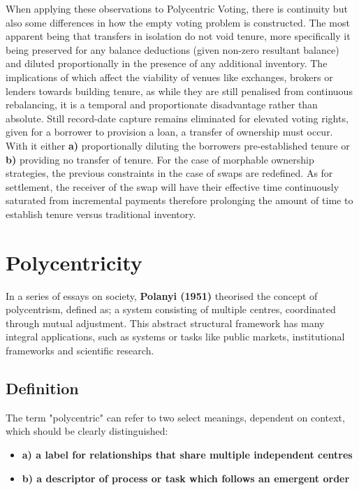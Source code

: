 \documentclass[a4paper,12pt]{article}
\begin{document}
When applying these observations to Polycentric Voting, there is continuity but also some differences in how the empty voting problem is constructed. The most apparent being that transfers in isolation do not void tenure, more specifically it being preserved for any balance deductions (given non-zero resultant balance) and diluted proportionally in the presence of any additional inventory. The implications of which affect the viability of venues like exchanges, brokers or lenders towards building tenure, as while they are still penalised from continuous rebalancing, it is a temporal and proportionate disadvantage rather than absolute. Still record-date capture remains eliminated for elevated voting rights, given for a borrower to provision a loan, a transfer of ownership must occur. With it either \textbf{a)} proportionally diluting the borrowers pre-established tenure or \textbf{b)} providing no transfer of tenure. For the case of morphable ownership strategies, the previous constraints in the case of swaps are redefined. As for settlement, the receiver of the swap will have their effective time continuously saturated from incremental payments therefore prolonging the amount of time to establish tenure versus traditional inventory.

\section{\signifier Polycentricity}

In a series of essays on society, \textbf{Polanyi (1951)} theorised the concept of polycentrism, defined as; a system consisting of multiple centres, coordinated through mutual adjustment. This abstract structural framework has many integral applications, such as systems or tasks like public markets, institutional frameworks and scientific research. 

\subsection{\signifier Definition}

The term "polycentric" can refer to two select meanings, dependent on context, which should be clearly distinguished:

\begin{itemize}[label=,leftmargin=\parindent]
\item\textbf{a) a label for relationships that share multiple independent centres} 
\item\textbf{b) a descriptor of process or task which follows an emergent order} 
\end{itemize}
\end{document}

